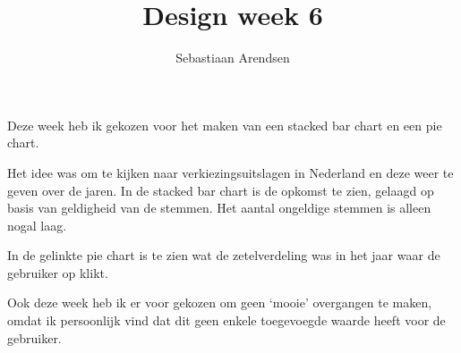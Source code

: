 \documentclass[a4paper]{scrartcl}
\title{Design week 6}
\author{Sebastiaan Arendsen}
\begin{document}
\maketitle

Deze week heb ik gekozen voor het maken van een stacked bar chart en een pie chart.

Het idee was om te kijken naar verkiezingsuitslagen in Nederland en deze weer te geven over de jaren. In de stacked bar chart is de opkomst te zien, gelaagd op basis van geldigheid van de stemmen. Het aantal ongeldige stemmen is alleen nogal laag.

In de gelinkte pie chart is te zien wat de zetelverdeling was in het jaar waar de gebruiker op klikt.

Ook deze week heb ik er voor gekozen om geen `mooie' overgangen te maken, omdat ik persoonlijk vind dat dit geen enkele toegevoegde waarde heeft voor de gebruiker.
\end{document}
